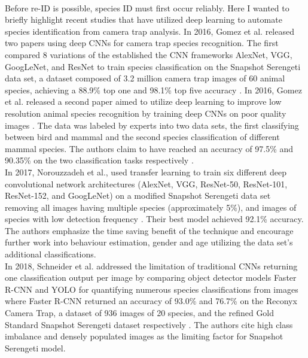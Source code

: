 \documentclass[11pt]{article}
\begin{document}
\newline
\\
Before re-ID is possible, species ID must first occur reliably. Here I wanted to briefly highlight recent studies that have utilized deep learning to automate species identification from camera trap analysis. In 2016, Gomez et al. released two papers using deep CNNs for camera trap species recognition. The first compared 8 variations of the established the CNN frameworks AlexNet, VGG, GoogLeNet, and ResNet to train species classification on the Snapshot Serengeti data set, a dataset composed of 3.2 million camera trap images of 60 animal species, achieving a 88.9\% top one and 98.1\% top five accuracy \cite{gomez2016towards}. In 2016, Gomez et al. released a second paper aimed to utilize deep learning to improve low resolution animal species recognition by training deep CNNs on poor quality images \cite{gomez2016animal}. The data was labeled by experts into two data sets, the first classifying between bird and mammal and the second species classification of different mammal species. The authors claim to have reached an accuracy of 97.5\% and 90.35\% on the two classification tasks respectively \cite{gomez2016animal}. 
\newline
\\
In 2017, Norouzzadeh et al., used transfer learning to train six different deep convolutional network architectures (AlexNet, VGG, ResNet-50, ResNet-101, ResNet-152, and GoogLeNet) on a modified Snapshot Serengeti data set removing all images having multiple species (approximately 5\%), and images of species with low detection frequency \cite{norouzzadehautomatically}. Their best model achieved 92.1\% accuracy. The authors emphasize the time saving benefit of the technique and encourage further work into behaviour estimation, gender and age utilizing the data set's additional classifications. 
\newline
\\
In 2018, Schneider et al. addressed the limitation of traditional CNNs returning one classification output per image by comparing object detector models Faster R-CNN and YOLO for quantifying numerous species classifications from images where Faster R-CNN returned an accuracy of 93.0\% and 76.7\% on the Reconyx Camera Trap, a dataset of 936 images of 20 species, and the refined Gold Standard Snapshot Serengeti dataset respectively \cite{schneider2018deep}. The authors cite high class imbalance and densely populated images as the limiting factor for Snapshot Serengeti model.
\end{document}
